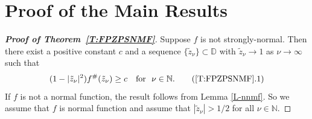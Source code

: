 \documentclass[11pt, reqno]{amsart}
\theoremstyle{definition}
\theoremstyle{remark}
\numberwithin{equation}{section}
\begin{document}
\section{Proof of the Main Results}
\begin{proof}[{\bf Proof of Theorem~\ref{T:FPZPSNMF}}]
Suppose $f$ is not strongly-normal. Then there exist a positive constant $c$ and a sequence $\{\tilde{z}_{\nu}\} \subset \mathbb D$
with $\tilde{z}_{\nu} \to 1$ as $\nu \to \infty$ such that
\begin{equation}
(1-|\tilde{z}_{\nu}|^{2}) f^{\#}(\tilde{z}_{\nu})\geq c \quad \text{for }\ \nu\in\mathbb N. \tag{\ref*{T:FPZPSNMF}.1}
\end{equation}
If $f$ is not a normal function, the result follows from Lemma \ref{L-nnmf}. So we assume that $f$ is normal function and assume that 
$|\tilde{z}_{\nu}|>1/2$ for all $\nu\in \mathbb N$. \smallskip


\end{proof}
\end{document}
